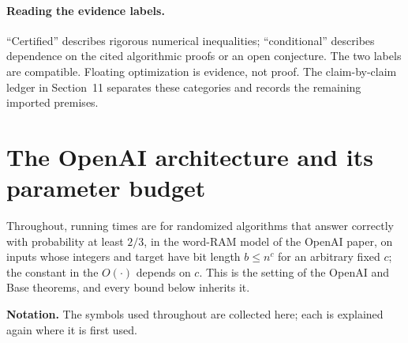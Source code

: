 \documentclass[11pt]{article}
\theoremstyle{plain}
\begin{document}
\paragraph{Reading the evidence labels.}
``Certified'' describes rigorous numerical inequalities; ``conditional'' describes dependence on the cited algorithmic proofs or an open conjecture. The two labels are compatible. Floating optimization is evidence, not proof. The claim-by-claim ledger in Section~11 separates these categories and records the remaining imported premises.


\section{The OpenAI architecture and its parameter budget}

Throughout, running times are for randomized algorithms that answer correctly with probability at least $2/3$, in the word-RAM model of the OpenAI paper, on inputs whose integers and target have bit length $b \le n^c$ for an arbitrary fixed $c$; the constant in the $O(\cdot)$ depends on $c$. This is the setting of the OpenAI and Base theorems, and every bound below inherits it.

\textbf{Notation.} The symbols used throughout are collected here; each is explained again where it is first used.
\end{document}
